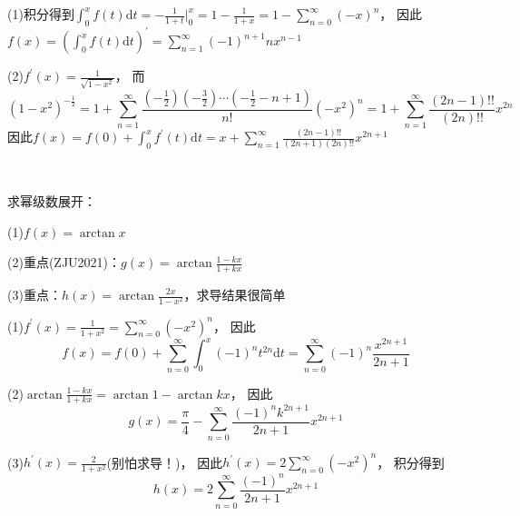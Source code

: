 \begin{solution}
  (1)积分得到$\int_0^x f(t)\mathrm{d} t = - \frac{1}{1+t}\bigg|^x_0 =1 - \frac{1}{1+x} = 1 - \sum\limits_{n = 0}^{\infty}(-x)^n$，
  因此$f(x) = \left( \int_0^x f(t)\mathrm{d}t \right)^{\prime} = \sum\limits_{n = 1}^{\infty}(-1)^{n+1}nx^{n-1}$

  (2)$f^{\prime}(x) = \frac{1}{\sqrt{1 - x^2}}$，
  而
  \begin{equation*}
    (1 - x^2)^{-\frac{1}{2}} = 1 + \sum\limits_{n = 1}^{\infty} \frac{(-\frac{1}{2})(- \frac{3}{2})\cdots (- \frac{1}{2} - n + 1)}{n!}(-x^2)^n = 1+ \sum\limits_{n = 1}^{\infty} \frac{(2n-1)!!}{(2n)!!}x^{2n}
  \end{equation*}
  因此$f(x) = f(0) + \int_0^x f^{\prime}(t)\mathrm{d} t = x + \sum\limits_{n = 1}^{\infty} \frac{(2n-1)!!}{(2n+1)(2n)!!}x^{2n+1}$
\end{solution}

~

\begin{exercise}
  求幂级数展开：

  (1)$f(x) = \arctan x$

  (2)重点(ZJU2021)：$g(x) = \arctan \frac{1 - kx}{1 + kx}$

  (3)重点：$h(x) = \arctan \frac{2x}{1 - x^2}$，求导结果很简单
\end{exercise}

\begin{solution}
  (1)$f^{\prime}(x) = \frac{1}{1+x^2} = \sum\limits_{n = 0}^{\infty}(-x^2)^n$，
  因此
  \begin{equation*}
    f(x) = f(0) + \sum\limits_{n = 0}^{\infty} \int_0^x (-1)^n t^{2n}\mathrm{d} t = \sum\limits_{n = 0}^{\infty} (-1)^n \frac{x^{2n+1}}{2n+1}
  \end{equation*}

  (2)$\arctan \frac{1-kx}{1+kx} = \arctan 1 - \arctan kx$，
  因此
  \begin{equation*}
    g(x) = \frac{\pi}{4} - \sum\limits_{n = 0}^{\infty} \frac{(-1)^n k^{2n+1}}{2n+1}x^{2n+1}
  \end{equation*}

  (3)$h^{\prime}(x) = \frac{2}{1+x^2}$(别怕求导！)，
  因此$h^{\prime}(x) = 2 \sum\limits_{n = 0}^{\infty} (-x^2)^n$，
  积分得到
  \begin{equation*}
    h(x) = 2 \sum\limits_{n = 0}^{\infty} \frac{(-1)^n}{2n+1}x^{2n+1}
  \end{equation*}
\end{solution}






